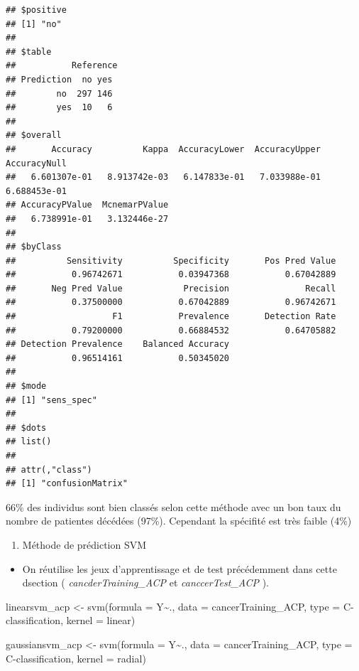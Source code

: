 \documentclass[
  12pt,
]{article}
\newenvironment{Shaded}{\begin{snugshade}}{\end{snugshade}}
\newcommand{\AttributeTok}[1]{\textcolor[rgb]{0.77,0.63,0.00}{#1}}
\newcommand{\FunctionTok}[1]{\textcolor[rgb]{0.00,0.00,0.00}{#1}}
\newcommand{\NormalTok}[1]{#1}
\newcommand{\OtherTok}[1]{\textcolor[rgb]{0.56,0.35,0.01}{#1}}
\newcommand{\SpecialCharTok}[1]{\textcolor[rgb]{0.00,0.00,0.00}{#1}}
\newcommand{\StringTok}[1]{\textcolor[rgb]{0.31,0.60,0.02}{#1}}
\providecommand{\tightlist}{%
  \setlength{\itemsep}{0pt}\setlength{\parskip}{0pt}}
\begin{document}
\begin{verbatim}
## $positive
## [1] "no"
## 
## $table
##           Reference
## Prediction  no yes
##        no  297 146
##        yes  10   6
## 
## $overall
##       Accuracy          Kappa  AccuracyLower  AccuracyUpper   AccuracyNull 
##   6.601307e-01   8.913742e-03   6.147833e-01   7.033988e-01   6.688453e-01 
## AccuracyPValue  McnemarPValue 
##   6.738991e-01   3.132446e-27 
## 
## $byClass
##          Sensitivity          Specificity       Pos Pred Value 
##           0.96742671           0.03947368           0.67042889 
##       Neg Pred Value            Precision               Recall 
##           0.37500000           0.67042889           0.96742671 
##                   F1           Prevalence       Detection Rate 
##           0.79200000           0.66884532           0.64705882 
## Detection Prevalence    Balanced Accuracy 
##           0.96514161           0.50345020 
## 
## $mode
## [1] "sens_spec"
## 
## $dots
## list()
## 
## attr(,"class")
## [1] "confusionMatrix"
\end{verbatim}

66\% des individus sont bien classés selon cette méthode avec un bon
taux du nombre de patientes décédées (97\%). Cependant la spécifité est
très faible (4\%)

\begin{enumerate}
\def\labelenumi{\arabic{enumi}.}
\setcounter{enumi}{1}
\tightlist
\item
  Méthode de prédiction SVM
\end{enumerate}

\begin{itemize}
\tightlist
\item
  On réutilise les jeux d'apprentissage et de test précédemment dans
  cette dsection ( \emph{cancderTraining\_ACP} et
  \emph{canccerTest\_ACP} ).
\end{itemize}

\begin{Shaded}
\begin{Highlighting}[]
\NormalTok{linearsvm\_acp }\OtherTok{\textless{}{-}}  \FunctionTok{svm}\NormalTok{(}\AttributeTok{formula =}\NormalTok{ Y}\SpecialCharTok{\textasciitilde{}}\NormalTok{., }
                  \AttributeTok{data =}\NormalTok{ cancerTraining\_ACP,}
                  \AttributeTok{type =} \StringTok{\textquotesingle{}C{-}classification\textquotesingle{}}\NormalTok{, }
                  \AttributeTok{kernel =} \StringTok{\textquotesingle{}linear\textquotesingle{}}\NormalTok{)}

\NormalTok{gaussiansvm\_acp }\OtherTok{\textless{}{-}} \FunctionTok{svm}\NormalTok{(}\AttributeTok{formula =}\NormalTok{ Y}\SpecialCharTok{\textasciitilde{}}\NormalTok{., }
                   \AttributeTok{data =}\NormalTok{ cancerTraining\_ACP,}
                   \AttributeTok{type =} \StringTok{\textquotesingle{}C{-}classification\textquotesingle{}}\NormalTok{, }
                   \AttributeTok{kernel =} \StringTok{\textquotesingle{}radial\textquotesingle{}}\NormalTok{)}
\end{Highlighting}
\end{Shaded}
\end{document}
